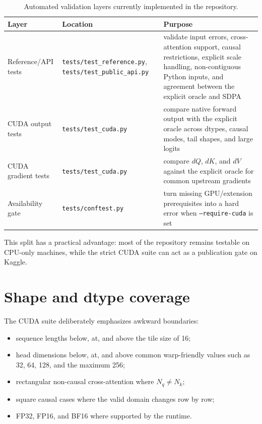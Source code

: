 \begin{table}[htbp]
\centering
\caption{Automated validation layers currently implemented in the repository.}
\label{tab:test-layers}
\begin{tabularx}{\textwidth}{@{}p{} p{} X@{}}
\toprule
Layer & Location & Purpose \\
\midrule
Reference/API tests & \texttt{tests/test\_reference.py}, \texttt{tests/test\_public\_api.py} & validate input errors, cross-attention support, causal restrictions, explicit scale handling, non-contiguous Python inputs, and agreement between the explicit oracle and SDPA \\
CUDA output tests & \texttt{tests/test\_cuda.py} & compare native forward output with the explicit oracle across dtypes, causal modes, tail shapes, and large logits \\
CUDA gradient tests & \texttt{tests/test\_cuda.py} & compare $dQ$, $dK$, and $dV$ against the explicit oracle for common upstream gradients \\
Availability gate & \texttt{tests/conftest.py} & turn missing GPU/extension prerequisites into a hard error when \texttt{--require-cuda} is set \\
\bottomrule
\end{tabularx}
\end{table}

This split has a practical advantage: most of the repository remains testable on CPU-only machines, while the strict CUDA suite can act as a publication gate on Kaggle.

\section{Shape and dtype coverage}

The CUDA suite deliberately emphasizes awkward boundaries:
\begin{itemize}
  \item sequence lengths below, at, and above the tile size of 16;
  \item head dimensions below, at, and above common warp-friendly values such as 32, 64, 128, and the maximum 256;
  \item rectangular non-causal cross-attention where $N_q \ne N_k$;
  \item square causal cases where the valid domain changes row by row;
  \item FP32, FP16, and BF16 where supported by the runtime.
\end{itemize}

